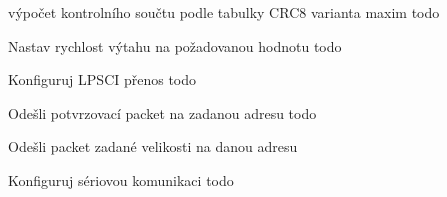 
\begin{DoxyRefList}
\item[Global \mbox{\hyperlink{serial_8h_ac8a1c8cc65788f7a505ecaafc97420f2}{crc8\+\_\+calc}} (unsigned char data\mbox{[}\mbox{]}, size\+\_\+t elements)]\label{todo__todo000006}%
%
výpočet kontrolního součtu podle tabulky C\+R\+C8 varianta maxim todo 
\item[Global \mbox{\hyperlink{main_8c_a3d2db5d9dffcd8d8cf33dfcff928ebd6}{elevator\+Speed}} (int32\+\_\+t data)]\label{todo__todo000004}%
%
Nastav rychlost výtahu na požadovanou hodnotu todo  
\item[Global \mbox{\hyperlink{main_8c_acec4214cddc4753d183cc092cd76d35b}{L\+P\+S\+I\+\_\+conf}} ()]\label{todo__todo000001}%
%
Konfiguruj L\+P\+S\+CI přenos todo 
\item[Global \mbox{\hyperlink{main_8c_ad2a81af0c10a6969a27ee19010276e13}{send\+Ack}} (char address)]\label{todo__todo000003}%
%
Odešli potvrzovací packet na zadanou adresu todo  
\item[Global \mbox{\hyperlink{main_8c_ae1926945483bcda7f88757caf7166c73}{send\+Packet}} (char address, char size, char data)]\label{todo__todo000002}%
%
Odešli packet zadané velikosti na danou adresu 
\item[Global \mbox{\hyperlink{main_8c_acd6d05ae41864fc2a7e228f225bfbbb3}{serial\+Conf}} ()]\label{todo__todo000005}%
%
Konfiguruj sériovou komunikaci todo
\end{DoxyRefList}